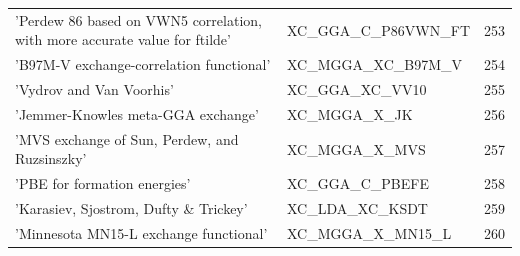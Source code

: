 \documentclass[final,12pt]{article}
\begin{document}
{{{{{{\begin{table}[!h]
\begin{center}
\begin{tabular}{llr}
  'Perdew 86 based on VWN5 correlation, with more accurate value for ftilde' & XC\_GGA\_C\_P86VWN\_FT  &253\\
  'B97M-V exchange-correlation functional' & XC\_MGGA\_XC\_B97M\_V  &254\\
  'Vydrov and Van Voorhis' & XC\_GGA\_XC\_VV10  &255\\
  'Jemmer-Knowles meta-GGA exchange' & XC\_MGGA\_X\_JK  &256\\
  'MVS exchange of Sun, Perdew, and Ruzsinszky' & XC\_MGGA\_X\_MVS  &257\\
  'PBE for formation energies' & XC\_GGA\_C\_PBEFE  &258\\
  'Karasiev, Sjostrom, Dufty \& Trickey' & XC\_LDA\_XC\_KSDT  &259\\
  'Minnesota MN15-L exchange functional' & XC\_MGGA\_X\_MN15\_L  &260\\
\hline
\hline
\end{tabular}
\end{center}
\end{table}

}}}}}}
\end{document}
